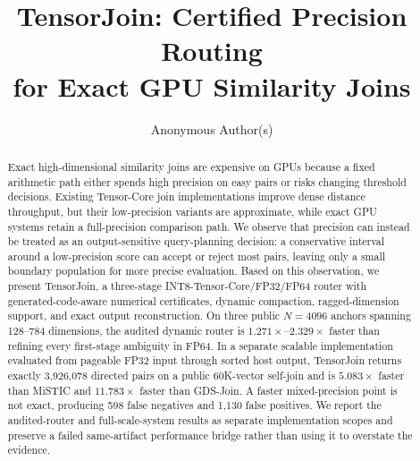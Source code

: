 \documentclass[sigconf,review,anonymous]{acmart}
\newcommand{\system}{TensorJoin\xspace}
\begin{document}
\title[TensorJoin: Certified Precision Routing for Exact GPU Joins]{TensorJoin: Certified Precision Routing\texorpdfstring{\\}{ }for Exact GPU Similarity Joins}

\author{Anonymous Author(s)}

\begin{abstract}
Exact high-dimensional similarity joins are expensive on GPUs because a fixed
arithmetic path either spends high precision on easy pairs or risks changing
threshold decisions.  Existing Tensor-Core join implementations improve dense
distance throughput, but their low-precision variants are approximate, while
exact GPU systems retain a full-precision comparison path.  We observe that
precision can instead be treated as an output-sensitive query-planning
decision: a conservative interval around a low-precision score can accept or
reject most pairs, leaving only a small boundary population for more precise
evaluation.  Based on this observation, we present \system, a three-stage
INT8-Tensor-Core/FP32/FP64 router with generated-code-aware numerical
certificates, dynamic compaction, ragged-dimension support, and exact output
reconstruction.  On three public $N=4096$ anchors spanning 128--784
dimensions, the audited dynamic router is $1.271\times$--$2.329\times$ faster
than refining every first-stage ambiguity in FP64.  In a separate scalable
implementation evaluated from pageable FP32 input through sorted host output,
\system returns exactly 3,926,078 directed pairs on a public 60K-vector
self-join and is $5.083\times$ faster than MiSTIC and $11.783\times$ faster
than GDS-Join.  A faster mixed-precision point is not exact, producing 598
false negatives and 1,130 false positives.  We report the audited-router and
full-scale-system results as separate implementation scopes and preserve a
failed same-artifact performance bridge rather than using it to overstate the
evidence.
\end{abstract}


\maketitle
\end{document}
